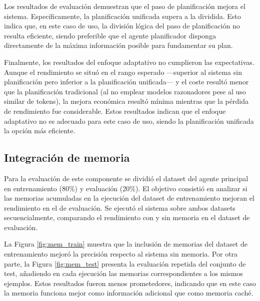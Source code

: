 Los resultados de evaluación demuestran que el paso de planificación mejora el sistema. Específicamente, la planificación unificada supera a la dividida. Esto indica que, en este caso de uso, la división lógica del paso de planificación no resulta eficiente, siendo preferible que el agente planificador disponga directamente de la máxima información posible para fundamentar su plan.

Finalmente, los resultados del enfoque adaptativo no cumplieron las expectativas. Aunque el rendimiento se situó en el rango esperado —superior al sistema sin planificación pero inferior a la planificación unificada— y el coste resultó menor que la planificación tradicional (al no emplear modelos razonadores pese al uso similar de tokens), la mejora económica resultó mínima mientras que la pérdida de rendimiento fue considerable. Estos resultados indican que el enfoque adaptativo no es adecuado para este caso de uso, siendo la planificación unificada la opción más eficiente.

\subsection{Integración de memoria}
Para la evaluación de este componente se dividió el dataset del agente principal en entrenamiento (80\%) y evaluación (20\%). El objetivo consistió en analizar si las memorias acumuladas en la ejecución del dataset de entrenamiento mejoran el rendimiento en el de evaluación. Se ejecutó el sistema sobre ambos datasets secuencialmente, comparando el rendimiento con y sin memoria en el dataset de evaluación.

La Figura \ref{fig:mem_train} muestra que la inclusión de memorias del dataset de entrenamiento mejoró la precisión respecto al sistema sin memoria. Por otra parte, la Figura \ref{fig:mem_test} presenta la evaluación repetida del conjunto de test, añadiendo en cada ejecución las memorias correspondientes a los mismos ejemplos. Estos resultados fueron menos prometedores, indicando que en este caso la memoria funciona mejor como información adicional que como memoria caché.

